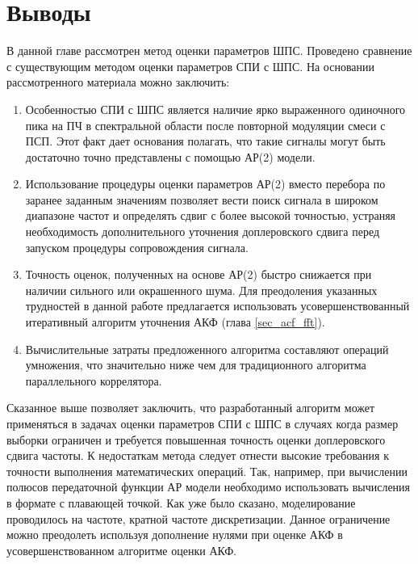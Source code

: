 \section{Выводы}

В данной главе рассмотрен метод оценки параметров ШПС. Проведено сравнение с существующим методом оценки параметров СПИ с ШПС. На основании рассмотренного материала можно заключить:
\begin{enumerate}
\item Особенностью СПИ с ШПС является наличие ярко выраженного одиночного пика на ПЧ в спектральной области после повторной модуляции смеси с ПСП.
	Этот факт дает основания полагать, что такие сигналы могут быть достаточно точно представлены с помощью АР(2) модели.
\item Использование процедуры оценки параметров АР(2) вместо перебора по заранее заданным значениям позволяет вести поиск сигнала в широком диапазоне частот и определять сдвиг
	с более высокой точностью, устраняя необходимость дополнительного уточнения доплеровского сдвига перед запуском процедуры сопровождения сигнала.
\item Точность оценок, полученных на основе АР(2) быстро снижается при наличии сильного или окрашенного шума. Для преодоления указанных трудностей в 
	данной работе предлагается использовать усовершенствованный итеративный алгоритм уточнения АКФ (глава \ref{sec_acf_fft}).
\item Вычислительные затраты предложенного алгоритма составляют   операций умножения, что значительно ниже чем   для традиционного алгоритма параллельного коррелятора.
\end{enumerate}

Сказанное выше позволяет заключить, что разработанный алгоритм может применяться в задачах оценки параметров СПИ с ШПС в случаях когда размер выборки ограничен и
требуется повышенная точность оценки доплеровского сдвига частоты. К недостаткам метода следует отнести высокие требования к точности выполнения математических операций.
Так, например, при вычислении полюсов передаточной функции АР модели необходимо использовать вычисления в формате с плавающей точкой. 
Как уже было сказано, моделирование проводилось на частоте, кратной частоте дискретизации. Данное ограничение можно преодолеть используя дополнение нулями при оценке АКФ
в усовершенствованном алгоритме оценки АКФ.

